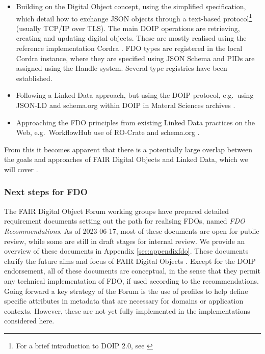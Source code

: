 \documentclass[fleqn,10pt,lineno]{wlpeerjlua}
\providecommand{\tightlist}{%
  \setlength{\itemsep}{0pt}\setlength{\parskip}{0pt}}
\begin{document}
\begin{itemize}
\tightlist
\item
  Building on the Digital Object concept, using the simplified \textcite{foundationDigitalObjectInterface} specification, which detail how to exchange JSON objects through a text-based protocol\footnote{For a brief introduction to DOIP 2.0, see \textcite{DOIPExamplesCordraa}} (usually TCP/IP over TLS). The main DOIP operations are retrieving, creating and updating digital objects. These are mostly realised using the reference implementation Cordra \autocite{tupelo-schneckrobertBriefIntroductionCordra2022}. FDO types are registered in the local Cordra instance, where they are specified using JSON Schema \autocite{Draftbhuttonjsonschema} and PIDs are assigned using the Handle system. Several type registries have been established.
\item
  Following a Linked Data approach, but using the DOIP protocol, e.g.~using JSON-LD and schema.org within DOIP in Materal Sciences archives \autocite{10.1002/jcc.26842}.
\item
  Approaching the FDO principles from existing Linked Data practices on the Web, e.g.~WorkflowHub use of RO-Crate and schema.org \autocite{10.3897/rio.8.e93937}.
\end{itemize}

From this it becomes apparent that there is a potentially large overlap between the goals and approaches of FAIR Digital Objects and Linked Data, which we will cover .


\subsubsection*{Next steps for FDO}\label{sec:next-step-fdo}

The FAIR Digital Object Forum \autocite{FAIRDigitalObjects} working groups have prepared detailed requirement documents \autocite{fdo-Specs} setting out the path for realising FDOs, named \emph{FDO Recommendations}. As of 2023-06-17, most of these documents are open for public review, while some are still in draft stages for internal review.  We provide an overview of these documents in Appendix \ref{sec:appendixfdo}. These documents clarify the future aims and focus of FAIR Digital Objects \autocite{fdo-Roadmap}.  Except for the DOIP endorsement, all of these documents are conceptual, in the sense that they permit any technical implementation of FDO, if used according to the recommendations. Going forward a key strategy of the Forum is the use of profiles to help define specific attributes in metadata that are necessary for domains or application contexts. However, these are not yet fully implemented in the implementations considered here. 
\end{document}
